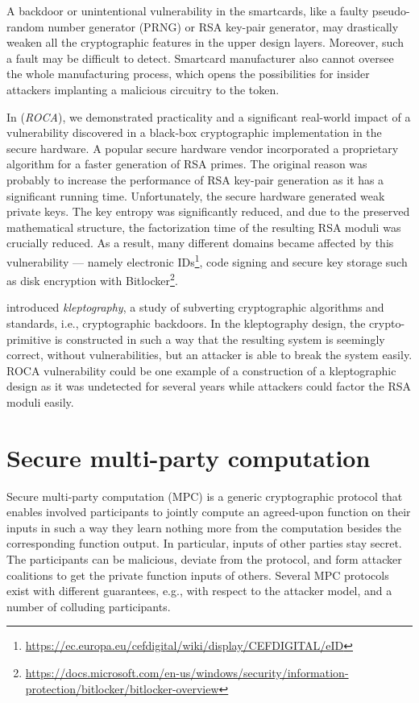 \documentclass[
  digital, %
  twoside, %
  table,   %
  lof,     %
  lot,     %
]{fithesis3}
\newcounter{ph4_show_guides}
\theoremstyle{definition}
\theoremstyle{remark}
\begin{document}
A backdoor or unintentional vulnerability in the smartcards, like a faulty pseudo-random number generator (PRNG) or RSA key-pair generator, may drastically weaken all the cryptographic features in the upper design layers. Moreover, such a fault may be difficult to detect. 
Smartcard manufacturer also cannot oversee the whole manufacturing process, which opens the possibilities for insider attackers implanting a malicious circuitry to the token.

In \cite{2017-ccs-nemec} (\emph{ROCA}), we demonstrated practicality and a significant real-world impact of a vulnerability discovered in a black-box cryptographic implementation in the secure hardware. A popular secure hardware vendor incorporated a proprietary algorithm for a faster generation of RSA primes. The original reason was probably to increase the performance of RSA key-pair generation as it has a significant running time. Unfortunately, the secure hardware generated weak private keys. The key entropy was significantly reduced, and due to the preserved mathematical structure, the factorization time of the resulting RSA moduli was crucially reduced.
As a result, many different domains became affected by this vulnerability — namely electronic IDs\footnote{\url{https://ec.europa.eu/cefdigital/wiki/display/CEFDIGITAL/eID}}, code signing and secure key storage such as disk encryption with Bitlocker\footnote{\url{https://docs.microsoft.com/en-us/windows/security/information-protection/bitlocker/bitlocker-overview}}.

\cite{Young:1996:DSB:646761.706030} introduced \emph{kleptography}, a study of subverting cryptographic algorithms and standards, i.e., cryptographic backdoors. In the kleptography design, the crypto-primitive is constructed in such a way that the resulting system is seemingly correct, without vulnerabilities, but an attacker is able to break the system easily. ROCA vulnerability could be one example of a construction of a kleptographic design as it was undetected for several years while attackers could factor the RSA moduli easily.

\section{Secure multi-party computation}
Secure multi-party computation (MPC) is a generic cryptographic protocol that enables involved participants to jointly compute an agreed-upon function on their inputs in such a way they learn nothing more from the computation besides the corresponding function output. In particular, inputs of other parties stay secret. The participants can be malicious, deviate from the protocol, and form attacker coalitions to get the private function inputs of others. Several MPC protocols exist with different guarantees, e.g., with respect to the attacker model, and a number of colluding participants.
\end{document}
